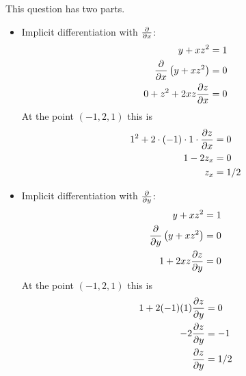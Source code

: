 \ifnum {} {\color{DarkBlue} This question has two parts. 

\begin{itemize}
    \item Implicit differentiation with $\frac{\partial}{\partial x}$:
    \begin{align}
        y+xz^2 &= 1 \\
        \frac{\partial}{\partial x} \left( y+xz^2 \right) &= 0 \\
        0 + z^2 + 2xz\frac{\partial z}{\partial x}&= 0 
    \end{align}
    At the point $(-1,2,1)$ this is
    \begin{align}
         1^2 + 2\cdot (-1) \cdot 1 \cdot\frac{\partial z}{\partial x} &= 0 \\
         1  - 2 z_x &= 0 \\
         z_x &=  1/2
    \end{align}
    \item Implicit differentiation with $\frac{\partial}{\partial y}$:
    \begin{align}
        y+xz^2 &= 1 \\
        \frac{\partial}{\partial y} \left( y+xz^2 \right) &= 0 \\
        1 + 2xz\frac{\partial z}{\partial y}&= 0 
    \end{align}
    At the point $(-1,2,1)$ this is
    \begin{align}
         1 + 2(-1)(1)\frac{\partial z}{\partial y} &= 0 \\
         -2\frac{\partial z}{\partial y} &= -1 \\
         \frac{\partial z}{\partial y} &= 1/2
    \end{align}
\end{itemize}
}
\else
\fi
\fi